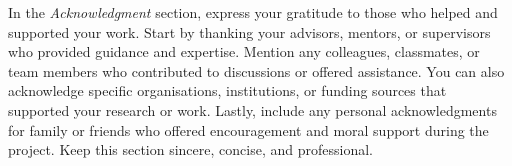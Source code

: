 \thispagestyle{plain} %


In the \textit{Acknowledgment} section, express your gratitude to those who helped and supported your work. Start by thanking your advisors, mentors, or supervisors who provided guidance and expertise. Mention any colleagues, classmates, or team members who contributed to discussions or offered assistance. You can also acknowledge specific organisations, institutions, or funding sources that supported your research or work. Lastly, include any personal acknowledgments for family or friends who offered encouragement and moral support during the project. Keep this section sincere, concise, and professional.

\plainblankpage
